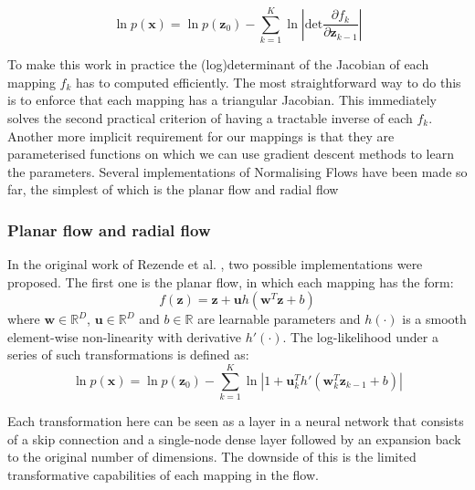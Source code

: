 \documentclass{article}
\newcommand{\bu}{\mathbf{u}}
\newcommand{\bw}{\mathbf{w}}
\newcommand{\bx}{\mathbf{x}}
\newcommand{\bz}{\mathbf{z}}
\newcommand{\parfrac}[2]{\frac{\partial #1}{\partial#2}}
\begin{document}
\begin{equation}\label{equation:change_of_variables_log_chain}
    \ln p(\bx) = \ln p(\bz_0) - \sum\limits^K_{k=1}\ln \left| \text{det} \parfrac{f_k}{\bz_{k-1}} \right|
\end{equation}

To make this work in practice the (log)determinant of the Jacobian of each mapping $f_k$ has to computed efficiently. The most straightforward way to do this is to enforce that each mapping has a triangular Jacobian. This immediately solves the second practical criterion of having a tractable inverse of each $f_k$. Another more implicit requirement for our mappings is that they are parameterised functions on which we can use gradient descent methods to learn the parameters. Several implementations of Normalising Flows have been made so far, the simplest of which is the planar flow and radial flow

\subsubsection{Planar flow and radial flow}
In the original work of Rezende et al. \cite{rezende2016variational}, two possible implementations were proposed. The first one is the planar flow, in which each mapping has the form:
\begin{equation}\label{equation:planar_flow}
    f(\bz) = \bz + \bu h(\bw^T\bz + b)
\end{equation}
where $\bw \in \mathbb{R}^D$, $\bu \in \mathbb{R}^D$ and $b \in \mathbb{R}$ are learnable parameters and $h(\cdot)$ is a smooth element-wise non-linearity with derivative $h'(\cdot)$. The log-likelihood under a series of such transformations is defined as:
\begin{equation}\label{equation:planar_flow_logdet}
    \ln p(\bx) = \ln p(\bz_0) - \sum\limits^K_{k=1} \ln \left|1 + \bu_k^T h'(\bw_k^T \bz_{k-1} + b) \right|
\end{equation}

Each transformation here can be seen as a layer in a neural network that consists of a skip connection and a single-node dense layer followed by an expansion back to the original number of dimensions. The downside of this is the limited transformative capabilities of each mapping in the flow.



\end{document}

